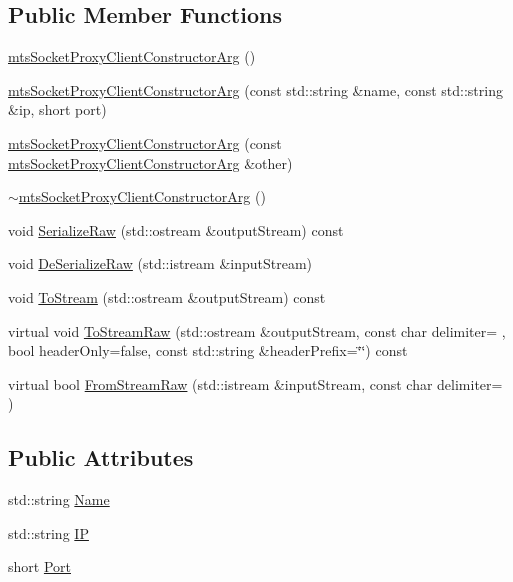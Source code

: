 \subsection*{Public Member Functions}
\begin{DoxyCompactItemize}
\item 
\hyperlink{classmts_socket_proxy_client_constructor_arg_af51660ccafe56eeb565f3c27aa341449}{mts\+Socket\+Proxy\+Client\+Constructor\+Arg} ()
\item 
\hyperlink{classmts_socket_proxy_client_constructor_arg_a9e6bd3ba5efa99aca6a727916ccc57dc}{mts\+Socket\+Proxy\+Client\+Constructor\+Arg} (const std\+::string \&name, const std\+::string \&ip, short port)
\item 
\hyperlink{classmts_socket_proxy_client_constructor_arg_a7b2fd4ef0cf1cce813c50b28ac9432c6}{mts\+Socket\+Proxy\+Client\+Constructor\+Arg} (const \hyperlink{classmts_socket_proxy_client_constructor_arg}{mts\+Socket\+Proxy\+Client\+Constructor\+Arg} \&other)
\item 
\hyperlink{classmts_socket_proxy_client_constructor_arg_a840ba0189021c3c87a7ce00fb632f5ea}{$\sim$mts\+Socket\+Proxy\+Client\+Constructor\+Arg} ()
\item 
void \hyperlink{classmts_socket_proxy_client_constructor_arg_a78bcddca08cafa20178c9198ac5eef13}{Serialize\+Raw} (std\+::ostream \&output\+Stream) const 
\item 
void \hyperlink{classmts_socket_proxy_client_constructor_arg_aaf7769aff584dabc42a6c2441c112926}{De\+Serialize\+Raw} (std\+::istream \&input\+Stream)
\item 
void \hyperlink{classmts_socket_proxy_client_constructor_arg_a02f856f05495f0218b0a4c9dddd23468}{To\+Stream} (std\+::ostream \&output\+Stream) const 
\item 
virtual void \hyperlink{classmts_socket_proxy_client_constructor_arg_a3b8e88637fd8afe325d30bf365e1e612}{To\+Stream\+Raw} (std\+::ostream \&output\+Stream, const char delimiter= \textquotesingle{} \textquotesingle{}, bool header\+Only=false, const std\+::string \&header\+Prefix=\char`\"{}\char`\"{}) const 
\item 
virtual bool \hyperlink{classmts_socket_proxy_client_constructor_arg_a2ec5f27563b8deef6677e915543dba80}{From\+Stream\+Raw} (std\+::istream \&input\+Stream, const char delimiter= \textquotesingle{} \textquotesingle{})
\end{DoxyCompactItemize}
\subsection*{Public Attributes}
\begin{DoxyCompactItemize}
\item 
std\+::string \hyperlink{classmts_socket_proxy_client_constructor_arg_a750e2b218eac14034166d2c4614cd2bf}{Name}
\item 
std\+::string \hyperlink{classmts_socket_proxy_client_constructor_arg_a86c3db84d1fd5663615915a4aa455845}{I\+P}
\item 
short \hyperlink{classmts_socket_proxy_client_constructor_arg_ab036fe588319de186ec63d6cf4900bc7}{Port}
\end{DoxyCompactItemize}


